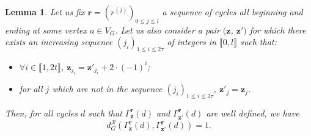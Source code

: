 \documentclass{article}
\newtheorem{lemma}[theorem]{Lemma}
\begin{document}
\begin{lemma}\label{lem:changing-sequence}
Let us fix $\textbf{r}=(r^{(j)})_{0 \le j \le l}$ a sequence of cycles all beginning and ending at some vertex $a\in V_G$.
Let us also consider a pair $(\textbf{z}$, $\textbf{z}')$ for which there exists an increasing sequence $(j_i)_{1 \le i \le 2\tau}$ of integers in $\llbracket 0, l \rrbracket$ such that: 
\begin{itemize}
\item $\forall i \in \llbracket 1, 2t\rrbracket$, $\textbf{z}_{j_i} = \textbf{z}'_{j_i} + 2\cdot(-1)^{i}$;
\item for all $j$ which are not in the sequence $(j_i)_{1 \le i \le 2\tau}$, $\textbf{z}'_{j} = \textbf{z}_{j}$.
\end{itemize}
Then, for all cycles $d$ such that $\Gamma^{\textbf{r}}_{\textbf{z}}(d)$ and $\Gamma^{\textbf{r}}_{\textbf{z}'}(d)$ are well defined, we have 
\[
d_G^{\mathcal{R}}(\Gamma^{\textbf{r}}_{\textbf{z}}(d), \Gamma^{\textbf{r}}_{\textbf{z}'}(d))=1.
\]
\end{lemma}
\end{document}

